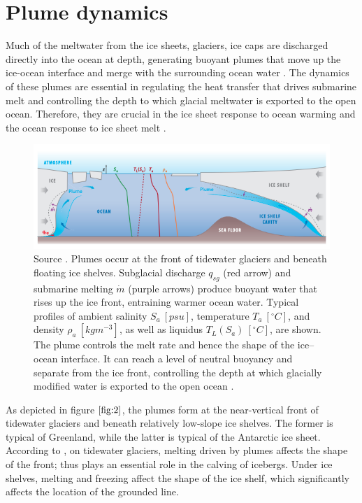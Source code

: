 \documentclass[11pt,a4paper]{article}
\begin{document}
	\section{Plume dynamics}
	Much of the meltwater from the ice sheets, glaciers, ice caps are discharged directly into the ocean at depth, generating buoyant plumes that move up the ice-ocean interface and merge with the surrounding ocean water \citep{hewitt2020subglacial}. The dynamics of these plumes are essential in regulating the heat transfer that drives submarine melt and controlling the depth to which glacial meltwater is exported to the open ocean. Therefore, they are crucial in the ice sheet response to ocean warming \citep{joughin2012ice, hewitt2020subglacial} and the ocean response to ice sheet melt \citep{straneo2013north}. 
	
		\begin{figure}[H]
	    \centering 
	    \includegraphics[width=15cm]{plume.png}
	    \caption{Source \cite{hewitt2020subglacial}. Plumes occur at the front of tidewater glaciers and beneath floating ice shelves. Subglacial discharge $q_{sg}$ (red arrow) and submarine melting $\dot{m}$ (purple arrows) produce buoyant water that rises up the ice front, entraining warmer ocean water. Typical profiles of ambient salinity $S_a\ [psu]$, temperature $T_a\ [^{\circ} C]$, and density $\rho_a\ [kg m^{-3}]$, as well as liquidus $T_L(S_a)\ [^{\circ} C]$, are shown. The plume controls the melt rate and hence the shape of the ice–ocean interface. It can reach a level of neutral buoyancy and separate from the ice front, controlling the depth at which glacially modified water is exported to the open ocean \citep{hewitt2020subglacial}.}%
	    \label{fig:2}
	\end{figure}
	
	
	\noindent As depicted in figure $\ref{fig:2}$, the plumes form at the near-vertical front of tidewater glaciers and beneath relatively low-slope ice shelves. The former is typical of Greenland, while the latter is typical of the Antarctic ice sheet. According to \cite{hewitt2020subglacial}, on tidewater glaciers, melting driven by plumes affects the shape of the front; thus plays an essential role in the calving of icebergs. Under ice shelves, melting and freezing affect the shape of the ice shelf, which significantly affects the location of the grounded line.%
	
\end{document}
